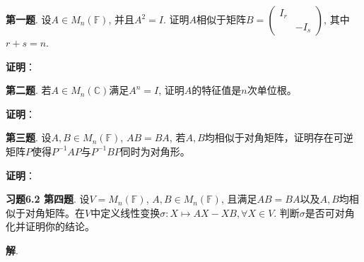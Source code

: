 
\renewcommand{\newpageorvspace}{\vspace{2em}}

\date{2022-3-25  第二次习题课}



\maketitle

{\bf 第一题}. 设$A \in M_n (\mathbb{F})$, 并且$A^2 = I$. 证明$A$相似于矩阵$B = \begin{pmatrix} I_r & \\ & -I_s \end{pmatrix}$, 其中$r+s=n$.

{\bf 证明}：

\newpageorvspace


{\bf 第二题}. 若$A \in M_n (\mathbb{C})$满足$A^n = I$, 证明$A$的特征值是$n$次单位根。

{\bf 证明}：

\newpageorvspace


{\bf 第三题}. 设$A, B \in M_n (\mathbb{F})$, $AB=BA$, 若$A,B$均相似于对角矩阵，证明存在可逆矩阵$P$使得$P^{-1}AP$与$P^{-1}BP$同时为对角形。

{\bf 证明}：


\newpageorvspace


{\bf 习题6.2 第四题}. 设$V = M_n (\mathbb{F})$, $A,B \in M_n (\mathbb{F})$, 且满足$AB=BA$以及$A,B$均相似于对角矩阵。在$V$中定义线性变换$\sigma: X \mapsto AX - XB, \forall X \in V$. 判断$\sigma$是否可对角化并证明你的结论。

{\bf 解}. 



